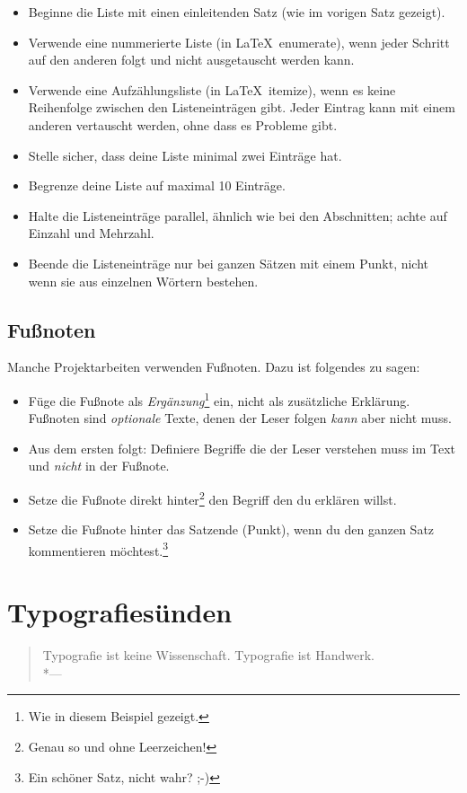 \documentclass[a4paper,titlepage=true,twoside]{scrartcl}
\newcommand{\gquote}[1]{\glqq #1\grqq}
\newcommand{\latexenv}[1]{\textsf{#1}}
\newenvironment{epigraph}[1]%
{\sbox{\Epigraph}{\textit{#1}}
\begin{quote}}%
{%
\\*\hspace{0pt}---\usebox{\Epigraph}%
\end{quote}}
\begin{document}
\begin{itemize}
 \item Beginne die Liste mit einen einleitenden Satz (wie im vorigen Satz gezeigt).
 \item Verwende eine nummerierte Liste (in \LaTeX\ \latexenv{enumerate}), wenn jeder
Schritt auf den anderen folgt und nicht ausgetauscht werden kann.
 \item Verwende eine Aufzählungsliste (in \LaTeX\ \latexenv{itemize}), wenn
  es keine Reihenfolge zwischen den Listeneinträgen gibt. Jeder Eintrag kann
  mit einem anderen vertauscht werden, ohne dass es Probleme gibt.
 \item Stelle sicher, dass deine Liste minimal zwei Einträge hat.
 \item Begrenze deine Liste auf maximal 10 Einträge.
 \item Halte die Listeneinträge \gquote{parallel}, ähnlich wie bei den Abschnitten;
  achte auf Einzahl und Mehrzahl.
 \item Beende die Listeneinträge nur bei ganzen Sätzen mit einem Punkt, nicht
  wenn sie aus einzelnen Wörtern bestehen.
\end{itemize}


\subsection{Fußnoten}
Manche Projektarbeiten verwenden Fußnoten. Dazu ist folgendes zu sagen:

\begin{itemize}
 \item Füge die Fußnote als \emph{Ergänzung}\footnote{Wie in diesem Beispiel gezeigt.}
  ein, nicht als zusätzliche Erklärung. Fußnoten sind \emph{optionale} Texte, denen der
  Leser folgen \emph{kann} aber nicht muss.
 \item Aus dem ersten folgt: Definiere Begriffe die der Leser verstehen muss im
  Text und \emph{nicht} in der Fußnote.
 \item Setze die Fußnote direkt hinter\footnote{Genau so und ohne Leerzeichen!}
  den Begriff den du erklären willst.
 \item Setze die Fußnote hinter das Satzende (Punkt), wenn du den ganzen Satz
  kommentieren möchtest.\footnote{Ein schöner Satz, nicht wahr? ;-)}
\end{itemize}



\section{Typografiesünden}
\begin{epigraph}{Hans-Peter Willberg}
 Typografie ist keine Wissenschaft. Typografie ist Handwerk.
\end{epigraph}
\end{document}
